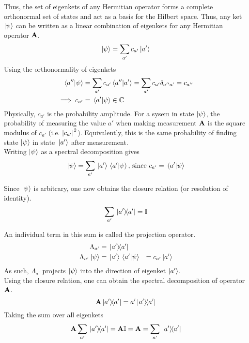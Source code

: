 \documentclass[12pt,a4paper,titlepage]{article}
\newcommand{\trm}[1]{\textrm{#1}} %
\begin{document}
Thus, the set of eigenkets of any Hermitian operator forms a complete orthonormal set of states and act as a basis for the Hilbert space. Thus, any ket $\ket{\psi}$ can be written as a linear combination of eigenkets for any Hermitian operator $\vb{A}$.
\begin{equation}
\ket{\psi}=\sum_{a'}c_{a'}\ket{a'}
\end{equation}
Using the orthonormality of eigenkets
\begin{equation}
\begin{aligned}
\braket*{a''}{\psi}&=\sum_{a'}c_{a'}\braket*{a''}{a'}=\sum_{a'}c_{a'}\delta_{a''a'}=c_{a''}\\
\implies c_{a'}&=\braket*{a'}{\psi}\in\mathbb{C}
\end{aligned}
\end{equation}
Physically, $c_{a'}$ is the probability amplitude. For a sysem in state $\ket{\psi}$, the probability of measuring the value $a'$ when making measurement $\vb{A}$ is the square modulus of $c_{a'}$ (i.e. $\abs{c_{a'}}^{2}$). Equivalently, this is the same probability of finding state $\ket{\psi}$ in state $\ket*{a'}$ after measurement.\\

Writing $\ket{\psi}$ as a spectral decomposition gives
\begin{equation}
\ket{\psi}=\sum_{a'}\ket*{a'}\ip*{a'}{\psi}\trm{, since $c_{a'}=\ip*{a'}{\psi}$}
\end{equation}

Since $\ket{\psi}$ is arbitrary, one now obtains the closure relation (or resolution of identity).
\begin{equation}
\sum_{a'}\op*{a'}{a'}=\mathbb{I}
\end{equation}

An individual term in this sum is called the projection operator.
\begin{equation}
\begin{aligned}
\Lambda_{a'}&=\op*{a'}{a'}\\
\Lambda_{a'}\ket{\psi}&=\ket*{a'}\ip*{a'}{\psi}&=c_{a'}\ket{a'}
\end{aligned}
\end{equation}
As such, $\Lambda_{a'}$ projects $\ket{\psi}$ into the direction of eigenket $\ket{a'}$.\\

Using the closure relation, one can obtain the spectral decomposition of operator $\vb{A}$.
\begin{equation}
\vb{A}\op*{a'}{a'}=a'\op*{a'}{a'}
\end{equation}
Taking the sum over all eigenkets
\begin{equation}
\vb{A}\sum_{a'}\op*{a'}{a'}=\vb{A}\mathbb{I}=\vb{A}=\sum_{a'}\op*{a'}{a'}
\end{equation}
\end{document}
